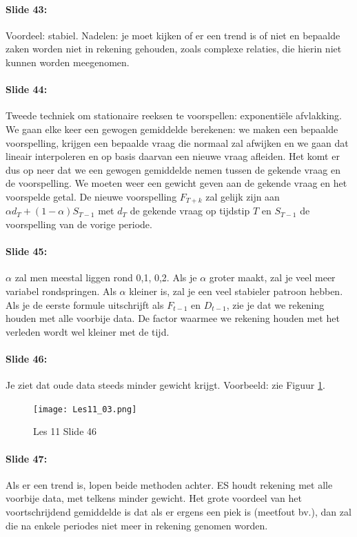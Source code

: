 \documentclass[10pt,a4paper]{report}
\begin{document}
\paragraph{Slide 43:} Voordeel: stabiel. Nadelen: je moet kijken of er een trend is of niet en bepaalde zaken worden niet in rekening gehouden, zoals complexe relaties, die hierin niet kunnen worden meegenomen.

\paragraph{Slide 44:} Tweede techniek om stationaire reeksen te voorspellen: exponenti\"ele afvlakking. We gaan elke keer een gewogen gemiddelde berekenen: we maken een bepaalde voorspelling, krijgen een bepaalde vraag die normaal zal afwijken en we gaan dat lineair interpoleren en op basis daarvan een nieuwe vraag afleiden. Het komt er dus op neer dat we een gewogen gemiddelde nemen tussen de gekende vraag en de voorspelling. We moeten weer een gewicht geven aan de gekende vraag en het voorspelde getal. De nieuwe voorspelling $F_{T+k}$ zal gelijk zijn aan $\alpha d_T + (1-\alpha)S_{T-1}$ met $d_T$ de gekende vraag op tijdstip $T$ en $S_{T-1}$ de voorspelling van de vorige periode.

\paragraph{Slide 45:} $\alpha$ zal men meestal liggen rond 0,1, 0,2. Als je $\alpha$ groter maakt, zal je veel meer variabel rondspringen. Als $\alpha$ kleiner is, zal je een veel stabieler patroon hebben. Als je de eerste formule uitschrijft als $F_{t-1}$ en $D_{t-1}$, zie je dat we rekening houden met alle voorbije data. De factor waarmee we rekening houden met het verleden wordt wel kleiner met de tijd. 

\paragraph{Slide 46:} Je ziet dat oude data steeds minder gewicht krijgt.
Voorbeeld: zie Figuur \ref{les11_03}.

\begin{figure}[h!]
\centering
\texttt{[image: Les11\_03.png]}
\caption{Les 11 Slide 46} 
\label{les11_03}
\end{figure}

\paragraph{Slide 47:} Als er een trend is, lopen beide methoden achter. ES houdt rekening met alle voorbije data, met telkens minder gewicht. Het grote voordeel van het voortschrijdend gemiddelde is dat als er ergens een piek is (meetfout bv.), dan zal die na enkele periodes niet meer in rekening genomen worden. 
\end{document}
